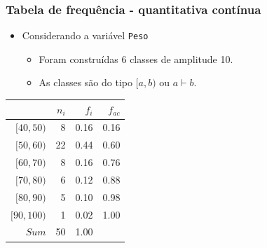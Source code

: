 \documentclass[11pt]{beamer}
\begin{document}
\begin{frame}
\frametitle{Tabela de frequência - quantitativa contínua}

\begin{itemize}
\item
  Considerando a variável \texttt{Peso}

  \begin{itemize}
  \item
    Foram construídas 6 classes de amplitude 10.
  \item
    As classes são do tipo \([a,b)\) ou \(a \vdash b\).
  \end{itemize}
\end{itemize}


\begin{table}[ht]
\centering
\begin{tabular}{rrrr}
  \hline
 & $n_i$ & $f_i$ & $f_{ac}$ \\ 
  \hline
$[40,50)$ & 8 & 0.16 & 0.16 \\ 
  $[50,60)$ & 22 & 0.44 & 0.60 \\ 
  $[60,70)$ & 8 & 0.16 & 0.76 \\ 
  $[70,80)$ & 6 & 0.12 & 0.88 \\ 
  $[80,90)$ & 5 & 0.10 & 0.98 \\ 
  $[90,100)$ & 1 & 0.02 & 1.00 \\ 
   \hline
$Sum$ & 50 & 1.00 &  \\ 
   \hline
\end{tabular}
\end{table}
\end{frame}
\end{document}
